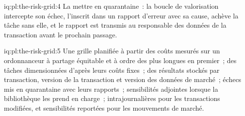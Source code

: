 \begin{solution}{iq:pl:the-risk-grid:4}
La mettre en quarantaine~: la boucle de valorisation intercepte son échec, l'inscrit dans un rapport d'erreur avec sa cause, achève la tâche sans elle, et le
rapport est transmis au responsable des données de la transaction avant le prochain passage.
\end{solution}

\begin{solution}{iq:pl:the-risk-grid:5}
Une grille planifiée à partir des coûts mesurés sur un ordonnanceur à partage équitable et à ordre des plus longues en premier~; des tâches dimensionnées d'après leurs coûts fixes~; des résultats
stockés par transaction, version de la transaction et version des données de marché~; échecs mis en quarantaine avec leurs rapports~; sensibilités adjointes lorsque la bibliothèque les prend en charge~;
 intrajournalières pour les transactions modifiées, et sensibilités reportées pour les mouvements de marché.
\end{solution}
